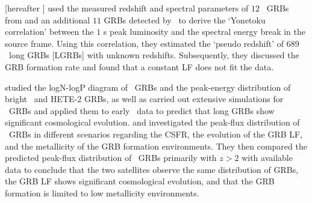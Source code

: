 \cite{Yonetoku_et_al.-2004-ApJ} [hereafter ] used the measured redshift and spectral parameters of $12$ \bs\ GRBs from \cite{Amati_et_al.-2002-A&A} and an additional $11$ GRBs detected by \B\ to derive the `Yonetoku correlation' between the $1$ s peak luminosity and the spectral energy break in the source frame. Using this correlation, they estimated the `pseudo redshift' of $689$ \B\ long GRBs [LGRBs] with unknown redshifts. Subsequently, they discussed the GRB formation rate and found that a constant LF does not fit the data.

\cite{Daigne_et_al.-2006-MNRAS} studied the logN-logP diagram of \B\ GRBs and the peak-energy distribution of bright \B\ and HETE-2 GRBs, as well as carried out extensive simulations for \s\ GRBs and applied them to early \s\ data to predict that long GRBs show significant cosmological evolution. \cite{Salvaterra_et_al.-2007-ApJ} and \cite{Salvaterra_et_al.-2009-MNRAS} investigated the peak-flux distribution of \B\ GRBs in different scenarios regarding the CSFR, the evolution of the GRB LF, and the metallicity of the GRB formation environments. They then compared the predicted peak-flux distribution of \s\ GRBs primarily with $z > 2$ with available data to conclude that the two satellites observe the same distribution of GRBs, the GRB LF shows significant cosmological evolution, and that the GRB formation is limited to low metallicity environments.

